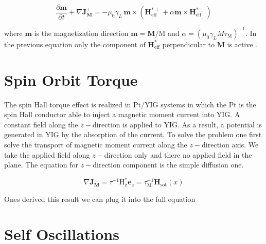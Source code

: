 \documentclass[twocolumn, final]{elsarticle}
\begin{document}

\begin{equation}
\label{EQ:d&p_t}
\frac{\partial  \mathbf{m}}{\partial  t} +\nabla\mathbf{J}^{\perp}_{\mathbf{M}}= -\mu_0\gamma_L \, \mathbf{m} \times \left( \mathbf{H}_\mathrm{eff}^{*\perp}+\alpha \mathbf{m} \times \mathbf{H}_\mathrm{eff}
^{*\perp}\right)
\end{equation}

where $\mathbf{m}$ is the magnetization direction $\mathbf{m} = \mathbf{M}/\mathrm{M}$ and $\alpha = (\mu_0\gamma_L M \tau_{\mathrm{M}})^{-1}$. In the previous equation only the 
component of $\mathbf{H}_\mathrm{eff}^*$ perpendicular to $\mathbf{M}$ is active . 

\section{Spin Orbit Torque}

The spin Hall torque effect is realized in Pt/YIG systems in which the Pt is the spin Hall conductor able to inject a magnetic moment current into YIG. A constant field along the $z-$direction  is applied to 
YIG. As a result, a potential is generated in YIG by the absorption of the current. To solve the problem one first solve the transport of magnetic moment current along the $z-$direction axis. We take the 
applied field along $z-$direction only and there no applied field in the plane. The equation for $z-$direction component is the simple diffusion one. 


\begin{equation}
\nabla\mathbf{J}^{\perp}_{\mathbf{M}}=\tau^{-1}\mathrm{H}^*_{\mathrm{\scriptstyle{z}}}\mathbf{e}_z= \tau^{-1}_\mathrm{M}\mathbf{H}_{\mathrm{\scriptstyle{sot}}}(x)
\end{equation}

Ones derived this result we can plug it into the full equation

\section{Self Oscillations}
\end{document}
